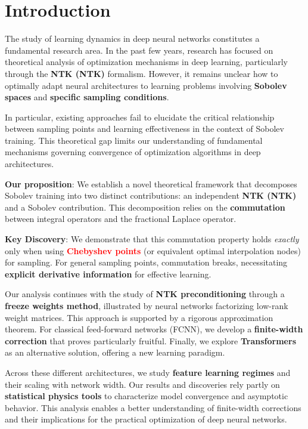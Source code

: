 \documentclass[a4paper]{article}
\theoremstyle{plain}
\theoremstyle{definition}
\theoremstyle{remark}
\begin{document}
\section*{Introduction}
The study of learning dynamics in deep neural networks constitutes a fundamental research area. In the past few years, research has focused on theoretical analysis of optimization mechanisms in deep learning, particularly through the \textbf{NTK (NTK)} formalism. However, it remains unclear how to optimally adapt neural architectures to learning problems involving \textbf{Sobolev spaces} and \textbf{specific sampling conditions}.

In particular, existing approaches fail to elucidate the critical relationship between sampling points and learning effectiveness in the context of Sobolev training. This theoretical gap limits our understanding of fundamental mechanisms governing convergence of optimization algorithms in deep architectures.

\textbf{Our proposition}: We establish a novel theoretical framework that decomposes Sobolev training into two distinct contributions: an independent \textbf{NTK (NTK)} and a Sobolev contribution. This decomposition relies on the \textbf{commutation} between integral operators and the fractional Laplace operator.

\textbf{Key Discovery}: We demonstrate that this commutation property holds \textit{exactly} only when using \textcolor{red}{\textbf{Chebyshev points}} (or equivalent optimal interpolation nodes) for sampling. For general sampling points, commutation breaks, necessitating \textbf{explicit derivative information} for effective learning.

Our analysis continues with the study of \textbf{NTK preconditioning} through a \textbf{freeze weights method}, illustrated by neural networks factorizing low-rank weight matrices. This approach is supported by a rigorous approximation theorem. For classical feed-forward networks (FCNN), we develop a \textbf{finite-width correction} that proves particularly fruitful. Finally, we explore \textbf{Transformers} as an alternative solution, offering a new learning paradigm.

Across these different architectures, we study \textbf{feature learning regimes} and their scaling with network width. Our results and discoveries rely partly on \textbf{statistical physics tools} to characterize model convergence and asymptotic behavior. This analysis enables a better understanding of finite-width corrections and their implications for the practical optimization of deep neural networks.
\end{document}
